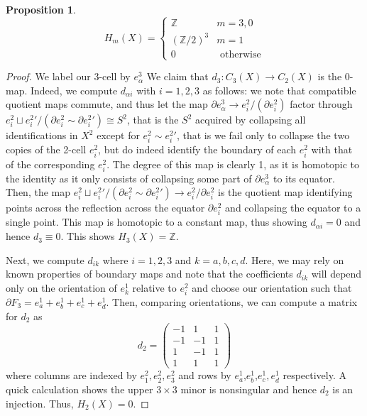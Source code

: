 \documentclass[english]{article}
\newcommand{\ZZ}{\mathbb{Z}}
\newcommand{\prt}[1]{\setcounter{subsection}{#1-1}\subsection{}}
\newtheorem*{proposition*}{Proposition}
\theoremstyle{remark}
\theoremstyle{definition}
\newcommand{\del}{\partial}
\begin{document}
\prt{2}
\begin{proposition*}
	\begin{equation*}
	H_m(X)=\begin{cases}
	\ZZ&m=3,0\\
	(\ZZ/2)^3&m=1\\0&\text{ otherwise}
	\end{cases}
	\end{equation*}
\end{proposition*}
\begin{proof}
	We label our $3$-cell by $e_\alpha^3$	We claim that $d_3:C_3(X)\to C_2(X)$ is the $0$-map. Indeed, we compute $d_{\alpha i}$ with $i=1,2,3$ as follows: we note that compatible quotient maps commute, and thus let the map $\del e_\alpha^3\to e_i^2/(\del e_i^2)$ factor through $e_i^2\sqcup {e_i^2}'/(\del e_i^2\sim \del {e_i^2}')\cong S^2$, that is the $S^2$ acquired by collapsing all identifications in $X^2$ except for $e_i^2\sim {e_i^2}'$, that is we fail only to collapse the two copies of the 2-cell $e_i^2$, but do indeed identify the boundary of each $e_i^2$ with that of the corresponding $e_i^2$. The degree of this map is clearly 1, as it is homotopic to the identity as it only consists of collapsing some part of $\del e_\alpha^3$ to its equator. Then, the map $e_i^2\sqcup {e_i^2}'/(\del e_i^2\sim \del {e_i^2}')\to e_i^2/\del e_i^2$ is the quotient map identifying points across the reflection across the equator $\del e_i^2$ and collapsing the equator to a single point. This map is homotopic to a constant map, thus showing $d_{\alpha i}=0$ and hence $d_3\equiv 0$. This shows $H_3(X)=\ZZ$.
	
	Next, we compute $d_{i k}$ where $i=1,2,3$ and $k=a,b,c,d$. Here, we may rely on known properties of boundary maps and note that the coefficients $d_{i k}$ will depend only on the orientation of $e_k^1$ relative to $e_i^2$ and choose our orientation such that $\del F_3=e_a^1+e_b^1+e_c^1+e_d^1$. Then, comparing orientations, we can compute a matrix for $d_2$ as \begin{equation*}
	d_2=\begin{pmatrix}
	-1&1&1\\
	-1&-1&1\\
	1&-1&1\\
	1&1&1
	\end{pmatrix}
	\end{equation*}
	where columns are indexed by $e_1^2,e_2^2,e_3^2$ and rows by $e_a^1$,$e_b^1$,$e_c^1,e_d^1$ respectively. A quick calculation shows the upper $3\times3$ minor is nonsingular and hence $d_2$ is an injection. Thus, $H_2(X)=0$.
	

\end{proof}
\end{document}

